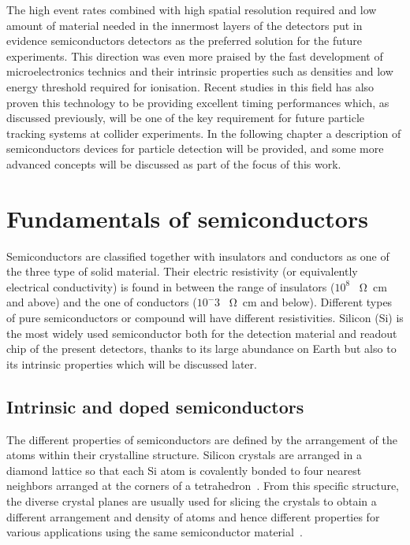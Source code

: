The high event rates combined with high spatial resolution required and low amount of material needed in the innermost layers of the detectors put in evidence semiconductors detectors as the preferred solution for the future experiments. This direction was even more praised by the fast development of microelectronics technics and their intrinsic properties such as densities and low energy threshold required for ionisation. Recent studies in this field has also proven this technology to be providing excellent timing performances which, as discussed previously, will be one of the key requirement for future particle tracking systems at collider experiments. In the following chapter a description of semiconductors devices for particle detection will be provided, and some more advanced concepts will be discussed as part of the focus of this work. 

	\section{Fundamentals of semiconductors}\label{sec:2.1}
	Semiconductors are classified together with insulators and conductors as one of the three type of solid material. Their electric resistivity (or equivalently electrical conductivity) is found in between the range of insulators ($10^8$ \SI{}{\ohm\centi\meter} and above) and the one of conductors ($10^-3$ \SI{}{\ohm\centi\meter} and below). Different types of pure semiconductors or compound will have different resistivities. Silicon (Si) is the most widely used semiconductor both for the detection material and readout chip of the present detectors, thanks to its large abundance on Earth but also to its intrinsic properties which will be discussed later.

		\subsection{Intrinsic and doped semiconductors}\label{subsec:2.1.1}
		The different properties of semiconductors are defined by the arrangement of the atoms within their crystalline structure. Silicon crystals are arranged in a diamond lattice so that each Si atom is covalently bonded to four nearest neighbors arranged at the corners of a tetrahedron\ \cite{SolidState}. From this specific structure, the diverse crystal planes are usually used for slicing the crystals to obtain a different arrangement and density of atoms and hence different properties for various applications using the same semiconductor material\ \cite{Si_Crystals_planes}. 

